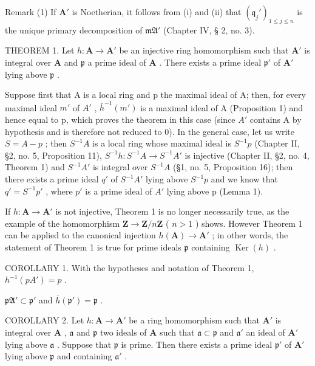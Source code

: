 Remark (1) If \(\mathbf{A}'\) is Noetherian, it follows from (i) and (ii) that \((\mathfrak{q}_j')_{1 \leqslant j \leqslant n}\) is the unique primary decomposition of \(\mathfrak{mA}'\) (Chapter IV, § 2, no. 3).

THEOREM 1. Let \(h: \mathbf{A} \to \mathbf{A}'\) be an injective ring homomorphism such that \(\mathbf{A}'\) is integral over \(\mathbf{A}\) and \(\mathfrak{p}\) a prime ideal of \(\mathbf{A}\) . There exists a prime ideal \(\mathfrak{p}'\) of \(\mathbf{A}'\) lying above \(\mathfrak{p}\) .

Suppose first that A is a local ring and p the maximal ideal of A; then, for every maximal ideal \(m'\) of \(A'\) , \(\bar{h}^{-1}(m')\) is a maximal ideal of A (Proposition 1) and hence equal to p, which proves the theorem in this case (since \(A'\) contains A by hypothesis and is therefore not reduced to 0). In the general case, let us write \(S = A - p\) ; then \(S^{-1}A\) is a local ring whose maximal ideal is \(S^{-1}p\) (Chapter II, §2, no. 5, Proposition 11), \(S^{-1}h: S^{-1}A \to S^{-1}A'\) is injective (Chapter II, §2, no. 4, Theorem 1) and \(S^{-1}A'\) is integral over \(S^{-1}A\) (§1, no. 5, Proposition 16); then there exists a prime ideal \(q'\) of \(S^{-1}A'\) lying above \(S^{-1}p\) and we know that \(q' = S^{-1}p'\) , where \(p'\) is a prime ideal of \(A'\) lying above p (Lemma 1).

If \(h: \mathbf{A} \to \mathbf{A}'\) is not injective, Theorem 1 is no longer necessarily true, as the example of the homomorphism \(\mathbf{Z} \to \mathbf{Z}/n\mathbf{Z}\) ( \(n > 1\) ) shows. However Theorem 1 can be applied to the canonical injection \(h(\mathbf{A}) \to \mathbf{A}'\) ; in other words, the statement of Theorem 1 is true for prime ideals \(\mathfrak{p}\) containing \(\operatorname{Ker}(h)\) .

COROLLARY 1. With the hypotheses and notation of Theorem 1, \(h^{-1}(pA') = p\) .

\(\mathfrak{pA}' \subset \mathfrak{p}'\) and \(\overline{h}(\mathfrak{p}') = \mathfrak{p}\) .

COROLLARY 2. Let \(h: \mathbf{A} \to \mathbf{A}'\) be a ring homomorphism such that \(\mathbf{A}'\) is integral over \(\mathbf{A}\) , \(\mathfrak{a}\) and \(\mathfrak{p}\) two ideals of \(\mathbf{A}\) such that \(\mathfrak{a} \subset \mathfrak{p}\) and \(\mathfrak{a}'\) an ideal of \(\mathbf{A}'\) lying above \(\mathfrak{a}\) . Suppose that \(\mathfrak{p}\) is prime. Then there exists a prime ideal \(\mathfrak{p}'\) of \(\mathbf{A}'\) lying above \(\mathfrak{p}\) and containing \(\mathfrak{a}'\) .

